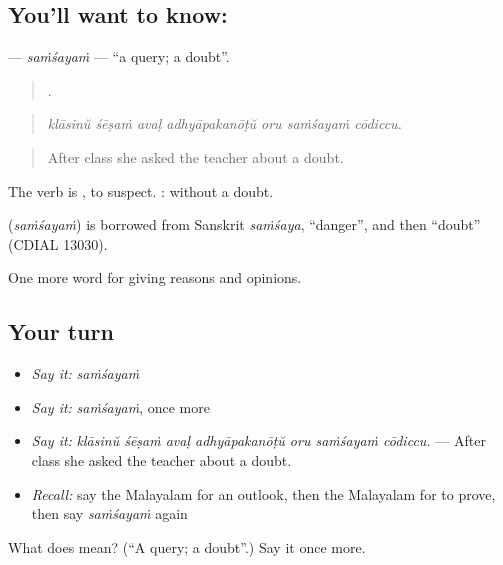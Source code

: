 \subsection*{You'll want to know: }
\textbf{} — \emph{saṁśayaṁ} — \textquotedblleft{}a query; a doubt\textquotedblright{}.

\begin{quote}
      .
\end{quote}

\begin{quote}
\emph{klāsinŭ śēṣaṁ avaḷ adhyāpakanōṭŭ oru saṁśayaṁ cōdiccu.}
\end{quote}

\begin{quote}
After class she asked the teacher about a doubt.
\end{quote}

The verb is , to suspect. : without a doubt.

\begin{cousinweb}
\textbf{} (\emph{saṁśayaṁ}) is borrowed from Sanskrit \emph{saṁśaya}, \textquotedblleft{}danger\textquotedblright{}, and then \textquotedblleft{}doubt\textquotedblright{} (CDIAL 13030).
\end{cousinweb}

\begin{grammarlens}[title={What you've built}]
One more word for giving reasons and opinions.
\end{grammarlens}

\subsection*{Your turn}
\begin{itemize}
\raggedright
  \item \emph{Say it:} \emph{saṁśayaṁ}
  \item \emph{Say it:} \emph{saṁśayaṁ}, once more
  \item \emph{Say it:} \emph{klāsinŭ śēṣaṁ avaḷ adhyāpakanōṭŭ oru saṁśayaṁ cōdiccu.} — After class she asked the teacher about a doubt.
  \item \emph{Recall:} say the Malayalam for an outlook, then the Malayalam for to prove, then say \emph{saṁśayaṁ} again
\end{itemize}

\begin{tcolorbox}[breakable,colback=teal!4,colframe=teal!35!black,title={Before you move on}]
What does  mean? (\textquotedblleft{}A query; a doubt\textquotedblright{}.) Say it once more.
\end{tcolorbox}
